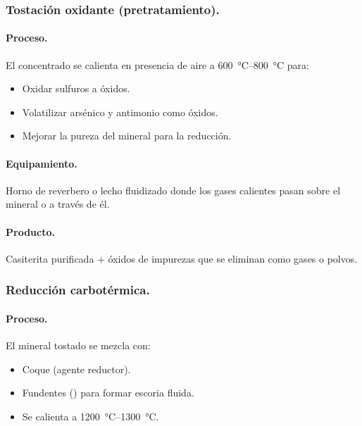 \documentclass[12pt,a4paper]{article}
\begin{document}
\subsubsection{Tostación oxidante (pretratamiento).}

\paragraph{Proceso.} El concentrado se calienta en presencia de aire a \SIrange[range-phrase = { - }, range-units=single]{600}{800}{\celsius} para:

\begin{itemize}
    \item Oxidar sulfuros a óxidos.
    \item Volatilizar arsénico y antimonio como óxidos.
    \item Mejorar la pureza del mineral para la reducción.
\end{itemize}

\paragraph{Equipamiento.} Horno de reverbero o lecho fluidizado donde los gases calientes pasan sobre el mineral o a través de él.

\paragraph{Producto.} Casiterita purificada + óxidos de impurezas que se eliminan como gases o polvos.

\subsubsection{Reducción carbotérmica.}

\paragraph{Proceso.} El mineral tostado se mezcla con:

\begin{itemize}
    \item Coque (agente reductor).
    \item Fundentes () para formar escoria fluida.
    \item Se calienta a \SIrange[range-phrase = { - }, range-units=single]{1200}{1300}{\celsius}.
\end{itemize}
\end{document}
